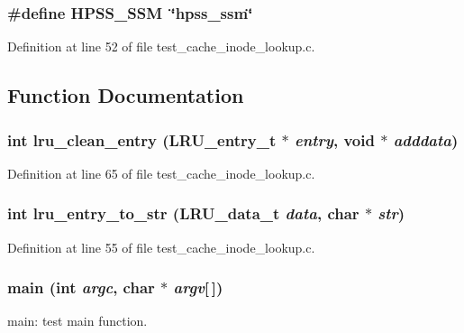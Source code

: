 \subsubsection[{HPSS\_\-SSM}]{\setlength{\rightskip}{0pt plus 5cm}\#define HPSS\_\-SSM~\char`\"{}hpss\_\-ssm\char`\"{}}\label{test__cache__inode__lookup_8c_a863b7cbf4c49b9bdda01992b993130a2}


Definition at line 52 of file test\_\-cache\_\-inode\_\-lookup.c.

\subsection{Function Documentation}
\subsubsection[{lru\_\-clean\_\-entry}]{\setlength{\rightskip}{0pt plus 5cm}int lru\_\-clean\_\-entry (LRU\_\-entry\_\-t $\ast$ {\em entry}, \/  void $\ast$ {\em adddata})}\label{test__cache__inode__lookup_8c_a27ecbab481a3103e078489a212a52e3f}


Definition at line 65 of file test\_\-cache\_\-inode\_\-lookup.c.
\subsubsection[{lru\_\-entry\_\-to\_\-str}]{\setlength{\rightskip}{0pt plus 5cm}int lru\_\-entry\_\-to\_\-str (LRU\_\-data\_\-t {\em data}, \/  char $\ast$ {\em str})}\label{test__cache__inode__lookup_8c_ad3e6e5506644e1986e6475939863ad3e}


Definition at line 55 of file test\_\-cache\_\-inode\_\-lookup.c.
\subsubsection[{main}]{\setlength{\rightskip}{0pt plus 5cm}main (int {\em argc}, \/  char $\ast$ {\em argv}[$\,$])}\label{test__cache__inode__lookup_8c_ae0665038b72011f5c680c660fcb59459}
main: test main function.

